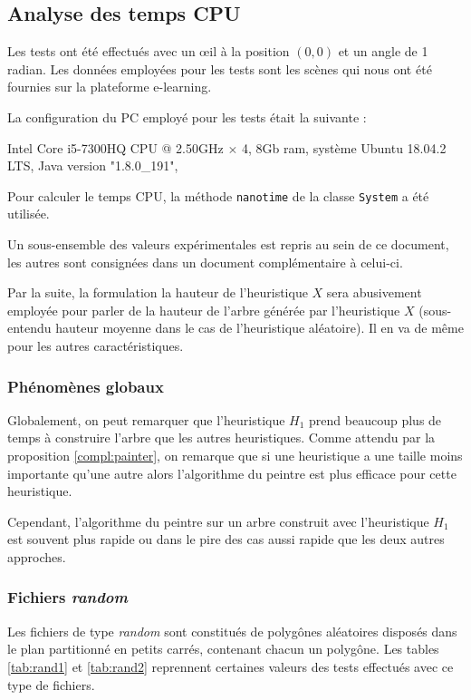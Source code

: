 \subsection{Analyse des temps CPU}
Les tests ont été effectués avec un \oe{}il à la position $(0,0)$ et un
angle de 1 radian. Les données employées pour les tests sont les scènes
qui nous ont été fournies sur la plateforme e-learning.

La configuration du PC employé pour les tests était la suivante :

\begin{center}
  Intel Core i5-7300HQ CPU @ 2.50GHz $\times$ 4,  8Gb ram, système Ubuntu 18.04.2 LTS,
  Java version "1.8.0\_191",
\end{center}
Pour calculer le temps CPU, la méthode \texttt{nanotime} de la classe
\texttt{System} a été utilisée.

Un sous-ensemble des valeurs expérimentales est repris au sein de
ce document, les autres sont consignées dans un document complémentaire
à celui-ci.

Par la suite, la formulation la hauteur de l'heuristique $X$ sera abusivement
employée pour parler de la hauteur de l'arbre générée par l'heuristique $X$
(sous-entendu hauteur moyenne dans le cas de l'heuristique aléatoire).
Il en va de même pour les autres caractéristiques.

\subsubsection*{Phénomènes globaux}
Globalement, on peut remarquer que l'heuristique $H_1$ prend beaucoup plus de
temps à construire l'arbre que les autres heuristiques.
Comme attendu par la proposition \ref{compl:painter}, on remarque
que si une heuristique a une taille moins importante qu'une autre
alors l'algorithme du peintre est plus efficace pour cette heuristique.

Cependant, l'algorithme du peintre sur un arbre construit
avec l'heuristique $H_1$ est souvent plus rapide ou dans le
pire des cas aussi rapide que les deux autres approches.

\subsubsection*{Fichiers \og\emph{random}\fg}
Les fichiers de type \og\emph{random}\fg{} sont constitués de polygônes
aléatoires disposés dans le plan partitionné en petits carrés, contenant
chacun un polygône. Les tables \ref{tab:rand1} et \ref{tab:rand2} reprennent
certaines valeurs des tests effectués avec ce type de fichiers.

